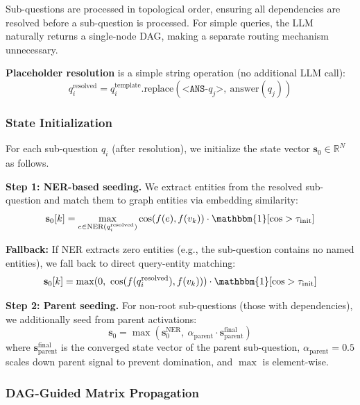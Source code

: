 \documentclass[11pt,a4paper]{article}
\begin{document}
Sub-questions are processed in topological order, ensuring all dependencies are resolved before a sub-question is processed. For simple queries, the LLM naturally returns a single-node DAG, making a separate routing mechanism unnecessary.

\textbf{Placeholder resolution} is a simple string operation (no additional LLM call):
\begin{equation}
    q_i^{\text{resolved}} = q_i^{\text{template}}.\text{replace}(\texttt{<ANS-}q_j\texttt{>},\ \text{answer}(q_j))
\end{equation}

\subsubsection{State Initialization}

For each sub-question $q_i$ (after resolution), we initialize the state vector $\mathbf{s}_0 \in \mathbb{R}^N$ as follows.

\textbf{Step 1: NER-based seeding.} We extract entities from the resolved sub-question and match them to graph entities via embedding similarity:
\begin{equation}
    \mathbf{s}_0[k] = \max_{e \in \text{NER}(q_i^{\text{resolved}})} \cos(f(e), f(v_k)) \cdot \mathbbm{1}[\cos > \tau_{\text{init}}]
\end{equation}

\textbf{Fallback:} If NER extracts zero entities (e.g., the sub-question contains no named entities), we fall back to direct query-entity matching:
\begin{equation}
    \mathbf{s}_0[k] = \max(0,\ \cos(f(q_i^{\text{resolved}}), f(v_k))) \cdot \mathbbm{1}[\cos > \tau_{\text{init}}]
\end{equation}

\textbf{Step 2: Parent seeding.} For non-root sub-questions (those with dependencies), we additionally seed from parent activations:
\begin{equation}
    \mathbf{s}_0 = \max(\mathbf{s}_0^{\text{NER}},\ \alpha_{\text{parent}} \cdot \mathbf{s}_{\text{parent}}^{\text{final}})
\end{equation}
where $\mathbf{s}_{\text{parent}}^{\text{final}}$ is the converged state vector of the parent sub-question, $\alpha_{\text{parent}} = 0.5$ scales down parent signal to prevent domination, and $\max$ is element-wise.

\subsubsection{DAG-Guided Matrix Propagation}
\end{document}
